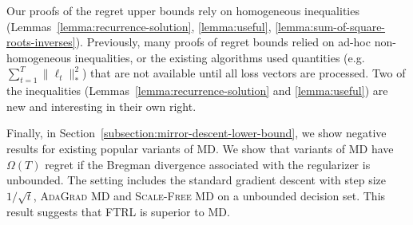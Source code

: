 Our proofs of the regret upper bounds rely on homogeneous inequalities
(Lemmas~\ref{lemma:recurrence-solution}, \ref{lemma:useful},
\ref{lemma:sum-of-square-roots-inverses}).  Previously, many proofs of regret
bounds relied on ad-hoc non-homogeneous inequalities, or the existing
algorithms used quantities (e.g.  $\sum_{t=1}^T \|\ell_t\|_*^2$) that are not
available until all loss vectors are processed. Two of the inequalities
(Lemmas~\ref{lemma:recurrence-solution} and \ref{lemma:useful}) are new and
interesting in their own right.

Finally, in Section~\ref{subsection:mirror-descent-lower-bound}, we show
negative results for existing popular variants of \textsc{MD}. We
show that variants of \textsc{MD} have $\Omega(T)$ regret if the
Bregman divergence associated with the regularizer is unbounded.
The setting includes the standard gradient descent with step size
$1/\sqrt{t}$, \textsc{AdaGrad MD} and \textsc{Scale-Free MD} on a
unbounded decision set. This result suggests that \textsc{FTRL}
is superior to \textsc{MD}.

